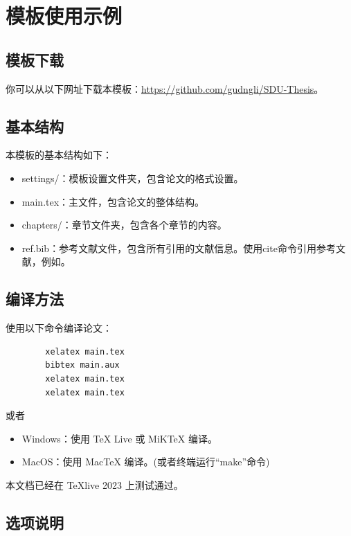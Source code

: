\documentclass{settings/sdu-thesis}
\begin{document}
\maketitlepagestatement



\content

\ftcontent

\chapter{模板使用示例}
\section{模板下载}
你可以从以下网址下载本模板：\url{https://github.com/gudngli/SDU-Thesis}。

\section{基本结构}
本模板的基本结构如下：
\begin{itemize}
    \item settings/：模板设置文件夹，包含论文的格式设置。
    \item main.tex：主文件，包含论文的整体结构。
    \item chapters/：章节文件夹，包含各个章节的内容。
    \item ref.bib：参考文献文件，包含所有引用的文献信息。使用cite命令引用参考文献，例如\cite{MSR-TIT24}。
\end{itemize}

\section{编译方法}
使用以下命令编译论文：
    \begin{verbatim}
        xelatex main.tex
        bibtex main.aux
        xelatex main.tex
        xelatex main.tex
    \end{verbatim}
或者
\begin{itemize}
    \item Windows：使用 TeX Live 或 MiKTeX 编译。
    \item MacOS：使用 MacTeX 编译。(或者终端运行``make''命令)
\end{itemize}
本文档已经在 TeXlive 2023 上测试通过。

\section{选项说明}
\end{document}
